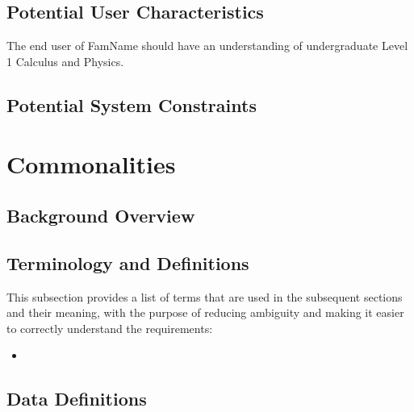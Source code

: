 \documentclass[12pt]{article}
\newcommand{\famname}{FamName} %
\begin{document}
\subsection{Potential User Characteristics} \label{SecUserCharacteristics}

The end user of \famname{} should have an understanding of undergraduate Level 1 Calculus and
Physics.

\subsection{Potential System Constraints}




\section{Commonalities}

\subsection{Background Overview} \label{Sec_Background}

\subsection{Terminology and  Definitions}

This subsection provides a list of terms that are used in the subsequent sections and their
meaning, with the purpose of reducing ambiguity and making it easier to correctly understand the
requirements:

\begin{itemize}

	\item

\end{itemize}

\subsection{Data Definitions} \label{sec_datadef}
\end{document}
